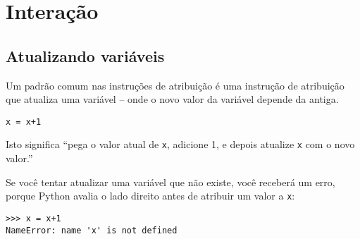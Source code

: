 
\chapter{Interação}

\section{Atualizando variáveis}
\label{atualizar}



Um padrão comum nas instruções de atribuição é uma instrução de atribuição
que atualiza uma variável -- onde o novo valor da variável depende da antiga.

\beforeverb
\begin{verbatim}
x = x+1
\end{verbatim}
\afterverb
%

%
Isto significa ``pega o valor atual de {\tt x}, adicione 1, e depois atualize
{\tt x} com o novo valor.''


Se você tentar atualizar uma variável que não existe, você receberá um erro,
porque Python avalia o lado direito antes de atribuir um valor a {\tt x}:

\beforeverb
\begin{verbatim}
>>> x = x+1
NameError: name 'x' is not defined
\end{verbatim}
\afterverb
%

